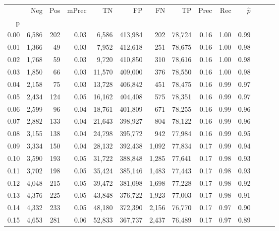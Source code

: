 \begin{tabular}{rrrrrrrrrrrrrr}
\toprule
{} &    Neg &    Pos & mPrec &       TN &       FP &      FN &      TP &  Prec &   Rec & $\hat{p}$ \\
p    &        &        &       &          &          &         &         &       &       &           \\
\midrule
0.00 &  6,586 &    202 &  0.03 &    6,586 &  413,984 &     202 &  78,724 &  0.16 &  1.00 &      0.99 \\
0.01 &  1,366 &     49 &  0.03 &    7,952 &  412,618 &     251 &  78,675 &  0.16 &  1.00 &      0.98 \\
0.02 &  1,768 &     59 &  0.03 &    9,720 &  410,850 &     310 &  78,616 &  0.16 &  1.00 &      0.98 \\
0.03 &  1,850 &     66 &  0.03 &   11,570 &  409,000 &     376 &  78,550 &  0.16 &  1.00 &      0.98 \\
0.04 &  2,158 &     75 &  0.03 &   13,728 &  406,842 &     451 &  78,475 &  0.16 &  0.99 &      0.97 \\
0.05 &  2,434 &    124 &  0.05 &   16,162 &  404,408 &     575 &  78,351 &  0.16 &  0.99 &      0.97 \\
0.06 &  2,599 &     96 &  0.04 &   18,761 &  401,809 &     671 &  78,255 &  0.16 &  0.99 &      0.96 \\
0.07 &  2,882 &    133 &  0.04 &   21,643 &  398,927 &     804 &  78,122 &  0.16 &  0.99 &      0.96 \\
0.08 &  3,155 &    138 &  0.04 &   24,798 &  395,772 &     942 &  77,984 &  0.16 &  0.99 &      0.95 \\
0.09 &  3,334 &    150 &  0.04 &   28,132 &  392,438 &   1,092 &  77,834 &  0.17 &  0.99 &      0.94 \\
0.10 &  3,590 &    193 &  0.05 &   31,722 &  388,848 &   1,285 &  77,641 &  0.17 &  0.98 &      0.93 \\
0.11 &  3,702 &    198 &  0.05 &   35,424 &  385,146 &   1,483 &  77,443 &  0.17 &  0.98 &      0.93 \\
0.12 &  4,048 &    215 &  0.05 &   39,472 &  381,098 &   1,698 &  77,228 &  0.17 &  0.98 &      0.92 \\
0.13 &  4,376 &    225 &  0.05 &   43,848 &  376,722 &   1,923 &  77,003 &  0.17 &  0.98 &      0.91 \\
0.14 &  4,332 &    233 &  0.05 &   48,180 &  372,390 &   2,156 &  76,770 &  0.17 &  0.97 &      0.90 \\
0.15 &  4,653 &    281 &  0.06 &   52,833 &  367,737 &   2,437 &  76,489 &  0.17 &  0.97 &      0.89 \\

\end{tabular}

